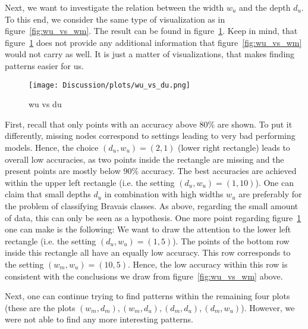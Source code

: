 Next, we want to investigate the relation between the width $w_u$ and the depth $d_u$.
To this end, we consider the same type of visualization as in figure~\ref{fig:wu_vs_wm}. The result can be found
in figure~\ref{fig:wu_vs_du}. Keep in mind, that figure~\ref{fig:wu_vs_du} does not provide any additional information
that figure~\ref{fig:wu_vs_wm} would not carry as well. It is just a matter of visualizations, that makes finding patterns
easier for us.
\begin{figure}[h]
    \centering
    \texttt{[image: Discussion/plots/wu\_vs\_du.png]}
    \caption{wu vs du}
    \label{fig:wu_vs_du}
\end{figure}
First, recall that only points with an accuracy above $80\%$ are shown. 
To put it differently, missing nodes correspond to settings leading to very bad performing models.
Hence, the choice $(d_u,w_u)=(2, 1)$ (lower right rectangle) leads to overall low accuracies, as two points inside the 
rectangle are missing and the present points are mostly below $90\%$ accuracy.
The best accuracies are achieved within the upper left rectangle (i.e. the setting $(d_u,w_u)=(1,10)$).
One can claim that small depths $d_u$ in combination with high widths $w_u$ are preferably for the problem
of classifying Bravais classes. As above, regarding the small amount of data, this can only be seen as a hypothesis.
One more point regarding figure~\ref{fig:wu_vs_du} one can make is the following: 
We want to draw the attention to the lower left rectangle (i.e. the setting $(d_u,w_u)=(1,5)$).
The points of the bottom row inside this rectangle all have an equally low accuracy. 
This row corresponds to the setting $(w_m, w_u)=(10, 5)$. Hence, the low accuracy within this row
is consistent with the conclusions we draw from figure~\ref{fig:wu_vs_wm} above.

Next, one can continue trying to find patterns within the remaining four plots 
(these are the plots $(w_m,d_m),(w_m,d_u),(d_m,d_u),(d_m,w_u)$). However, we were not able
to find any more interesting patterns. 

%

